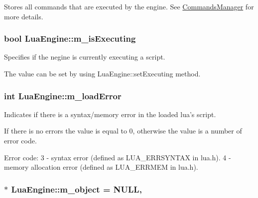 Stores all commands that are executed by the engine. See \hyperlink{class_commands_manager}{Commands\-Manager} for more details. 

\hypertarget{class_lua_engine_ad2bf267f4030d958e5a6f88a3a19e039}{
\subsubsection[{m\-\_\-is\-Executing}]{\setlength{\rightskip}{0pt plus 5cm}bool Lua\-Engine\-::m\-\_\-is\-Executing\hspace{0.3cm}{\ttfamily [private]}}}\label{class_lua_engine_ad2bf267f4030d958e5a6f88a3a19e039}


Specifies if the negine is currently executing a script. 

The value can be set by using Lua\-Engine\-::set\-Executing method. \hypertarget{class_lua_engine_af8dca74620280060399b5b7dd937af44}{
\subsubsection[{m\-\_\-load\-Error}]{\setlength{\rightskip}{0pt plus 5cm}int Lua\-Engine\-::m\-\_\-load\-Error\hspace{0.3cm}{\ttfamily [private]}}}\label{class_lua_engine_af8dca74620280060399b5b7dd937af44}


Indicates if there is a syntax/memory error in the loaded lua's script. 

If there is no errors the value is equal to 0, otherwise the value is a number of error code. \begin{DoxyVerb}            Error code:
            3 - syntax error (defined as LUA_ERRSYNTAX in lua.h).
            4 - memory allocation error (defined as LUA_ERRMEM in lua.h).\end{DoxyVerb}
 \hypertarget{class_lua_engine_a27899d8e22a8da3067519562500b9c7f}{
\subsubsection[{m\-\_\-object}]{ $\ast$ Lua\-Engine\-::m\-\_\-object = N\-U\-L\-L\hspace{0.3cm}{\ttfamily [static]}, {\ttfamily [private]}}}\label{class_lua_engine_a27899d8e22a8da3067519562500b9c7f}


